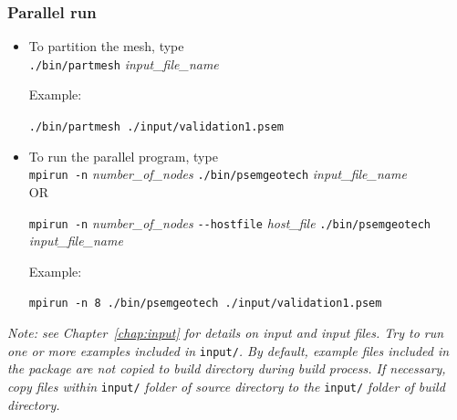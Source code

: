 \subsubsection{Parallel run}
\begin{itemize}[-]
\item To partition the mesh, type \\
    \texttt{./bin/partmesh} \emph{input\_file\_name}

    Example:

    \texttt{./bin/partmesh ./input/validation1.psem}

\item To run the parallel program, type \\
    \texttt{mpirun -n} \emph{number\_of\_nodes} \texttt{./bin/psemgeotech} \emph{input\_file\_name} \\

    OR

    \texttt{mpirun -n} \emph{number\_of\_nodes} \texttt{-{}-hostfile} \emph{host\_file} \texttt{./bin/psemgeotech} \emph{input\_file\_name}

    Example:

    \texttt{mpirun -n 8 ./bin/psemgeotech ./input/validation1.psem}
\end{itemize}

{\emph{Note: see Chapter~\ref{chap:input} for details on input and input files. Try to run one or more examples included in}} \texttt{input/}{\emph{. By default, example files included in the package are not copied to build directory during build process. If necessary, copy files within}} \texttt{input/} {\emph{folder of source directory to the}} \texttt{input/} {\emph{folder of build directory.}}

